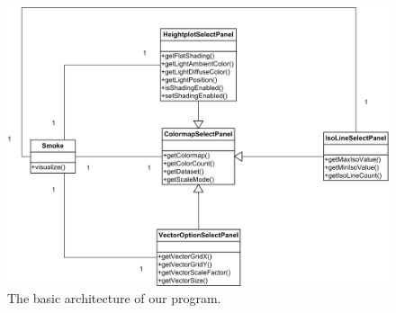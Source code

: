 \documentclass[a4paper,11pt,twoside]{report}
\begin{document}
		\begin{figure}[h]
		\centering
		\includegraphics[scale=1.0]{images/architecture.png}
		\caption{The basic architecture of our program.}\label{fig:architecture}
		\end{figure}
		\clearpage
\end{document}
